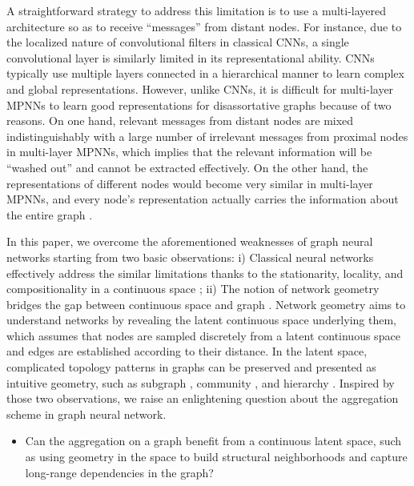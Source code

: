 \documentclass{article} \usepackage{iclr2020_conference,times}
\begin{document}
A straightforward strategy to address this limitation is to use a multi-layered architecture so as to receive ``messages'' from distant nodes. 
For instance, due to the localized nature of convolutional filters in classical CNNs, a single convolutional layer is similarly limited in its representational ability.
CNNs typically use multiple layers connected in a hierarchical manner to learn complex and global representations. 
However, unlike CNNs, it is difficult for multi-layer MPNNs to learn good representations for disassortative graphs because of two reasons. 
On one hand, relevant messages from distant nodes are mixed indistinguishably with a large number of irrelevant messages from proximal nodes in multi-layer MPNNs, which implies that the relevant information will be ``washed out''  and cannot be extracted effectively. 
On the other hand, the representations of different nodes would become very similar in multi-layer MPNNs, and every node's representation actually carries the information about the entire graph \citep{DBLP:conf/icml/XuLTSKJ18}.


In this paper, we overcome the aforementioned weaknesses of graph neural networks starting from two basic observations: 
i) Classical neural networks effectively address the similar limitations thanks to the stationarity, locality, and compositionality in a continuous space \citep{bronstein2017geometric}; 
ii) The notion of network geometry bridges the gap between continuous space and graph \citep{hoff2002latent,muscoloni2017machine}.
Network geometry aims to understand networks by revealing the latent continuous space underlying them, which assumes that nodes are sampled discretely from a latent continuous space and edges are established according to their distance. 
In the latent space, complicated topology patterns in graphs can be preserved and presented as intuitive geometry, such as subgraph \citep{DBLP:journals/corr/NarayananCCLS16}, community \citep{ni2019community}, and hierarchy \citep{DBLP:conf/nips/NickelK17,DBLP:conf/icml/NickelK18}. 
Inspired by those two observations, we raise an enlightening question about the aggregation scheme in graph neural network.
\begin{itemize}[leftmargin=15pt]
	\item Can the aggregation on a graph benefit from a continuous latent space, such as using geometry in the space to build structural neighborhoods and capture long-range dependencies in the graph?
\end{itemize}
\end{document}
